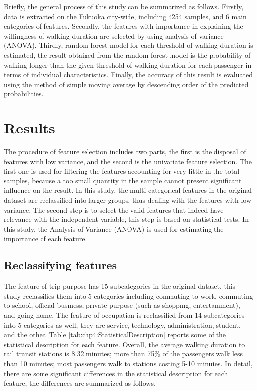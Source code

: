 %
Briefly, the general process of this study can be summarized as follows. Firstly, data is extracted on the Fukuoka city-wide, including 4254 samples, and 6 main categories of features. Secondly, the features with importance in explaining the willingness of walking duration are selected by using analysis of variance (ANOVA). Thirdly, random forest model for each threshold of walking duration is estimated, the result obtained from the random forest model is the probability of walking longer than the given threshold of walking duration for each passenger in terms of individual characteristics. Finally, the accuracy of this result is evaluated using the method of simple moving average by descending order of the predicted probabilities.

%
\section{Results}
The procedure of feature selection includes two parts, the first is the disposal of features with low variance, and the second is the univariate feature selection. The first one is used for filtering the features accounting for very little in the total samples, because a too small quantity in the sample cannot present significant influence on the result. In this study, the multi-categorical features in the original dataset are reclassified into larger groups, thus dealing with the features with low variance. The second step is to select the valid features that indeed have relevance with the independent variable, this step is based on statistical tests. In this study, the Analysis of Variance (ANOVA) is used for estimating the importance of each feature.

%
\subsection{Reclassifying features}
The feature of trip purpose has 15 subcategories in the original dataset, this study reclassifies them into 5 categories including commuting to work, commuting to school, official business, private purpose (such as shopping, entertainment), and going home. The feature of occupation is reclassified from 14 subcategories into 5 categories as well, they are service, technology, administration, student, and the other. Table \ref{tab:chp4:StatisticalDescription} reports some of the statistical description for each feature. Overall, the average walking duration to rail transit stations is 8.32 minutes; more than 75\% of the passengers walk less than 10 minutes; most passengers walk to stations costing 5-10 minutes. In detail, there are some significant differences in the statistical description for each feature, the differences are summarized as follows.

